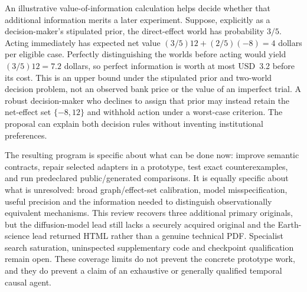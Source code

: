 An illustrative value-of-information calculation helps decide whether that
additional information merits a later experiment. Suppose, explicitly as a
decision-maker's stipulated prior, the direct-effect world has probability
$3/5$. Acting immediately has expected net value
$(3/5)12+(2/5)(-8)=4$ dollars per eligible case. Perfectly distinguishing the
worlds before acting would yield $(3/5)12=7.2$ dollars, so perfect information
is worth at most USD~3.2 before its cost. This is an upper bound under the
stipulated prior and two-world decision problem, not an observed bank price
or the value of an imperfect trial. A robust decision-maker who declines to
assign that prior may instead retain the net-effect set $\{-8,12\}$ and
withhold action under a worst-case criterion. The proposal can explain both
decision rules without inventing institutional preferences.
\citep{exec15_latent_exact}

The resulting program is specific about what can be done now: improve
semantic contracts, repair selected adapters in a prototype, test exact
counterexamples, and run predeclared public/generated comparisons. It is
equally specific about what is unresolved: broad graph/effect-set
calibration, model misspecification, useful precision and the information
needed to distinguish observationally equivalent mechanisms. This review
recovers three additional primary originals, but the diffusion-model lead
still lacks a securely acquired original and the Earth-science lead returned
HTML rather than a genuine technical PDF. Specialist search saturation,
uninspected supplementary code and checkpoint qualification remain open.
These coverage limits do not prevent the concrete prototype work, and they
do prevent a claim of an exhaustive or generally qualified temporal causal
agent.
\citep{exec15_latent_design}
\label{exec15:latent-temporal-end}
